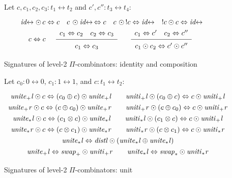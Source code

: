 \documentclass{article}
\newcommand{\identlp}{\mathit{unite}_+\mathit{l}}
\newcommand{\identrp}{\mathit{uniti}_+\mathit{l}}
\newcommand{\identlsp}{\mathit{unite}_+\mathit{r}}
\newcommand{\identrsp}{\mathit{uniti}_+\mathit{r}}
\newcommand{\swapp}{\mathit{swap}_+}
\newcommand{\identlt}{\mathit{unite}_*\mathit{l}}
\newcommand{\identrt}{\mathit{uniti}_*\mathit{l}}
\newcommand{\identlst}{\mathit{unite}_*\mathit{r}}
\newcommand{\identrst}{\mathit{uniti}_*\mathit{r}}
\newcommand{\swapt}{\mathit{swap}_*}
\newcommand{\distl}{\mathit{distl}}
\newcommand{\idc}{\mathit{id}\!\!\leftrightarrow}
\newcommand{\Rule}[4]{
\makebox{{\rm #1}
$\displaystyle
\frac{\begin{array}{l}#2 \\\end{array}}
{\begin{array}{l}#3      \\\end{array}}$
 #4}}
\begin{document}
\begin{figure}[t]
Let $c, c_1, c_2, c_3 : t_1 \leftrightarrow t_2$ and $c', c'' : t_3 \leftrightarrow t_4$:
\[\def\arraystretch{1.3}
\begin{array}{c}
  {\idc \odot \, c \Leftrightarrow c}
\quad
  {c \, \odot \idc \, \Leftrightarrow c}
\quad
  {c\,\, \odot\,! c \Leftrightarrow \idc}
\quad
  {! c \odot c \Leftrightarrow \idc}
\\
  {c \Leftrightarrow c}
\quad
\Rule{}
  {c_1 \Leftrightarrow c_2 \quad c_2 \Leftrightarrow c_3}
  {c_1 \Leftrightarrow c_3}
  {}
\quad
\Rule{}
  {c_1 \Leftrightarrow c' \quad c_2 \Leftrightarrow c''}
  {c_1 \odot c_2 \Leftrightarrow c' \odot c''}
  {}
\end{array}\]
\caption{\label{figh}Signatures of level-2 $\Pi$-combinators: identity and composition}
\end{figure}

\begin{figure}[t]
Let $c_0 : 0 \leftrightarrow 0$, $c_1 : 1 \leftrightarrow 1$, and $c : t_1 \leftrightarrow t_2$:
\[\def\arraystretch{1.3}
\begin{array}{c}
  {\identlp \odot c \Leftrightarrow (c_0 \oplus c) \odot \identlp}
\qquad
  {\identrp \odot (c_0 \oplus c) \Leftrightarrow c \odot \identrp}
\\
  {\identlsp \odot c \Leftrightarrow (c \oplus c_0) \odot \identlsp}
\qquad
  {\identrsp \odot (c \oplus c_0) \Leftrightarrow c \odot \identrsp}
\\
  {\identlt \odot c \Leftrightarrow (c_1 \otimes c) \odot \identlt}
\qquad
  {\identrt \odot (c_1 \otimes c) \Leftrightarrow c \odot \identrp}
\\
  {\identlst \odot c \Leftrightarrow (c \otimes c_1) \odot \identlst}
\qquad
  {\identrst \odot (c \otimes c_1) \Leftrightarrow c \odot \identrst}
\\
  {\identlt \Leftrightarrow \distl \odot (\identlt \oplus \identlt)}
\\
\identlp \Leftrightarrow \swapp \odot \identrsp
\qquad
\identlt \Leftrightarrow \swapt \odot \identrst
\end{array}\]
\caption{\label{figg}Signatures of level-2 $\Pi$-combinators: unit}
\end{figure}
\end{document}
